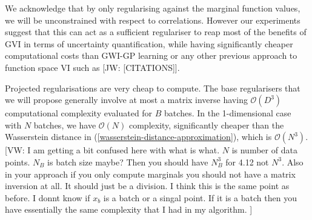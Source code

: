 \documentclass{article}
\newcommand{\jw}[1]{{\color{gray} [JW: #1]}}
\newcommand{\vw}[1]{{\color{green} [VW: #1]}}
\numberwithin{equation}{section}
\begin{document}
We acknowledge that by only regularising against the marginal function values, we will be unconstrained with respect to correlations.
However our experiments suggest that this can act as a  sufficient regulariser to reap most of the benefits of GVI in terms of uncertainty quantification, while having significantly cheaper computational costs than GWI-GP learning or any other previous approach to function space VI such as \jw{[CITATIONS]}.

Projected regularisations are very cheap to compute.
The base regularisers that we will propose generally involve at most a matrix inverse having $\mathcal{O}(D^3)$ computational complexity evaluated for $B$ batches.
In the 1-dimensional case with $N$ batches, we have $\mathcal{O}(N)$ complexity, significantly cheaper than the Wasserstein distance in (\ref{wasserstein-distance-approximation}), which is $\mathcal{O}(N^3)$. \vw{I am getting a bit confused here with what is what. $N$ is number of data points. $N_B$ is batch size maybe? Then you should have $N_B^3$ for 4.12 not $N^3$. Also in your approach if you only compute marginals you should not have a matrix inversion at all. It should just be a division. I think this is the same point as before. I donnt know if $x_b$ is a batch or a singal point. If it is a batch then you have essentially the same complexity that I had in my algorithm. }
\end{document}
